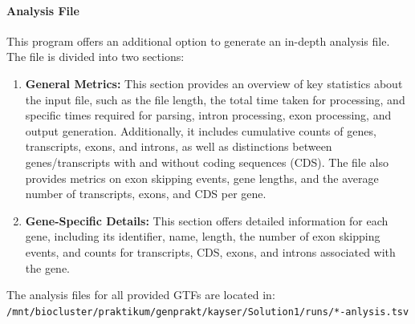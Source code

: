 \documentclass{article}
\begin{document}
    \paragraph{Analysis File} This program offers an additional option to generate an in-depth analysis file. The file is divided into two sections:
    \begin{enumerate}
        \item \textbf{General Metrics:} This section provides an overview of key statistics about the input file, such as the file length, the total time taken for processing, and specific times required for parsing, intron processing, exon processing, and output generation. Additionally, it includes cumulative counts of genes, transcripts, exons, and introns, as well as distinctions between genes/transcripts with and without coding sequences (CDS). The file also provides metrics on exon skipping events, gene lengths, and the average number of transcripts, exons, and CDS per gene.
        \item \textbf{Gene-Specific Details:} This section offers detailed information for each gene, including its identifier, name, length, the number of exon skipping events, and counts for transcripts, CDS, exons, and introns associated with the gene.
    \end{enumerate}
    The analysis files for all provided GTFs are located in:\\
    \texttt{/mnt/biocluster/praktikum/genprakt/kayser/Solution1/runs/*-anlysis.tsv}
\end{document}
